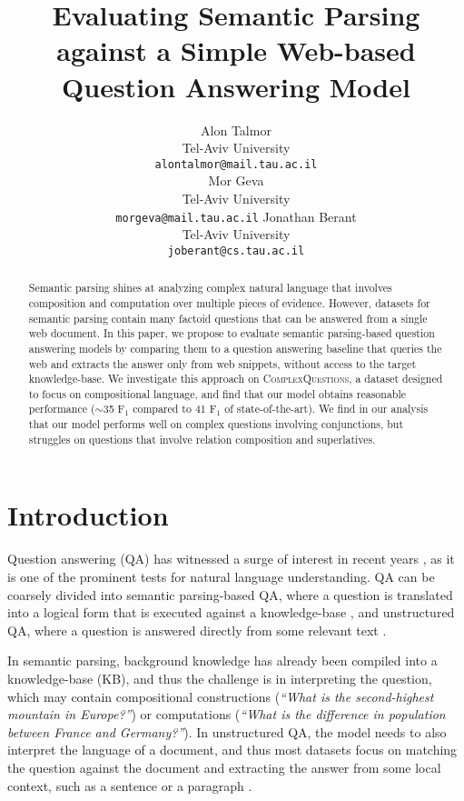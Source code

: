 \documentclass[11pt,a4paper]{article}
\title{Evaluating Semantic Parsing against a Simple Web-based Question Answering Model}
\author{Alon Talmor \\ Tel-Aviv University \\  {\small \tt alontalmor@mail.tau.ac.il} \\ 
         \And  Mor Geva \\ Tel-Aviv University \\  {\small \tt morgeva@mail.tau.ac.il} \And
         Jonathan Berant \\ Tel-Aviv University \\ {\small \tt joberant@cs.tau.ac.il}}
\date{}
\newcommand\nl[1]{{\it``#1''}}
\begin{document}
\maketitle

\begin{abstract}
Semantic parsing shines at analyzing complex natural language that involves composition and computation over multiple pieces of evidence. However, datasets for semantic parsing contain many factoid questions that can be answered from a single web document. 
In this paper, 
we propose to evaluate semantic parsing-based question answering models by comparing them to a  question answering baseline that queries the web and extracts the answer only from web snippets, without access to the target knowledge-base. We investigate 
this approach on \textsc{ComplexQuestions}, a dataset designed to focus on compositional language, and find that our model obtains reasonable performance ($\sim$35 F$_1$ compared to 41 F$_1$ of state-of-the-art). We find in our analysis that our model performs well on complex questions involving conjunctions, but struggles on questions that involve relation composition and superlatives.
\end{abstract}

\section{Introduction}
Question answering (QA) has witnessed a surge of interest in recent years \cite{hill2015goldilocks,yang2015wikiqa,pasupat2015compositional,chen2016thorough,joshi2017triviaqa}, as it is one of the prominent tests for natural language understanding. QA can be coarsely divided into semantic parsing-based QA, where a question is translated into a logical form that is executed against a knowledge-base \cite{zelle96geoquery,zettlemoyer05ccg,liang11dcs,kwiatkowski2013scaling,reddy2014large,berant2015agenda}, and unstructured QA, where a question is answered directly from some relevant text \cite{voorhees2000building,hermann2015read,hewlett2016wikireading,kadlec2016text,seo2016bidaf}. 

In semantic parsing, background knowledge has already been compiled into a knowledge-base (KB), and thus the challenge is in interpreting the question, which may contain compositional constructions (\nl{What is the second-highest mountain in Europe?}) or computations (\nl{What is the difference in population between France and Germany?}). In unstructured QA, the model needs to  also interpret the language of a document, and thus most datasets focus on matching the question against the document and extracting the answer from some local context, such as a sentence or a paragraph \cite{onishi2016wdw,rajpurkar2016squad,yang2015wikiqa}.
\end{document}
